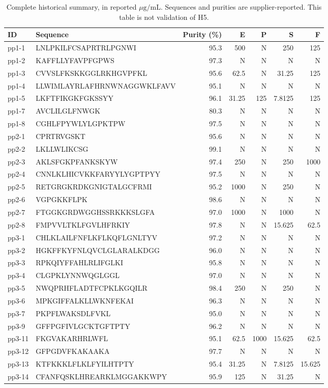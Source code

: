 \documentclass[12pt,a4paper]{article}
\newcommand{\ug}{\ensuremath{\mu\mathrm{g}/\mathrm{mL}}}
\begin{document}
\clearpage
\begin{table}[!ht]\centering\singlespacing\footnotesize
\setlength{\tabcolsep}{3pt}
\caption{Complete historical summary, in reported \ug. Sequences and purities are supplier-reported. This table is not validation of H5.}\label{tab:historical}
\begin{tabular}{llrrrrr}\toprule
ID & Sequence & Purity (\%) & E & P & S & F\\\midrule
pp1-1 & LNLPKILFCSAPRTRLPGNWI & 95.3 & 500 & N & 250 & 125 \\
pp1-2 & KAFFLLYFAVPFGPWS & 97.3 & N & N & N & N \\
pp1-3 & CVVSLFKSKKGGLRKHGVPFKL & 95.6 & 62.5 & N & 31.25 & 125 \\
pp1-4 & LLWIMLAYRLAFHRNWNAGGWKLFAVV & 95.1 & N & N & N & N \\
pp1-5 & LKFTFIKGKFGKSSYY & 96.1 & 31.25 & 125 & 7.8125 & 125 \\
pp1-7 & AVCLILGLFNWGK & 80.3 & N & N & N & N \\
pp1-8 & CGHLFPYWLYLGPKTPW & 97.5 & N & N & N & N \\
pp2-1 & CPRTRVGSKT & 95.6 & N & N & N & N \\
pp2-2 & LKLLWLIKCSG & 99.1 & N & N & N & N \\
pp2-3 & AKLSFGKPFANKSKYW & 97.4 & 250 & N & 250 & 1000 \\
pp2-4 & CNNLKLHICVKKFARYYLYGPTPYY & 97.5 & N & N & N & N \\
pp2-5 & RETGRGKRDKGNIGTALGCFRMI & 95.2 & 1000 & N & 250 & N \\
pp2-6 & VGPGKKFLPK & 98.6 & N & N & N & N \\
pp2-7 & FTGGKGRDWGGHSSRKKKSLGFA & 97.0 & 1000 & N & 1000 & N \\
pp2-8 & FMPVVLTKLFGVLHFRKIY & 97.8 & N & N & 15.625 & 62.5 \\
pp3-1 & CHLKLAILFNFLKFLKQFLGNLTYV & 97.2 & N & N & N & N \\
pp3-2 & HGKFFKYFNLQVCLGLARALKDGG & 96.0 & N & N & N & N \\
pp3-3 & RPKQIYFFAHLRLIFGLKI & 95.8 & N & N & N & N \\
pp3-4 & CLGPKLYNNWQGLGGL & 97.0 & N & N & N & N \\
pp3-5 & NWQPRHFLADTFCPKLKGQILR & 98.4 & 250 & N & 250 & N \\
pp3-6 & MPKGIFFALKLLWKNFEKAI & 96.3 & N & N & N & N \\
pp3-7 & PKPFLWAKSDLFVKL & 95.0 & N & N & N & N \\
pp3-9 & GFFPGFIVLGCKTGFTPTY & 96.2 & N & N & N & N \\
pp3-11 & FKGVAKARHRLWFL & 95.1 & 62.5 & 1000 & 15.625 & 62.5 \\
pp3-12 & GFPGDVFKAKAAKA & 97.7 & N & N & N & N \\
pp3-13 & KTFKKKLFLKLFYILHTPTY & 95.4 & 31.25 & N & 7.8125 & 15.625 \\
pp3-14 & CFANFQSKLHREARKLMGGAKKWPY & 95.9 & 125 & N & 31.25 & N \\\bottomrule
\end{tabular}\end{table}
\end{document}
